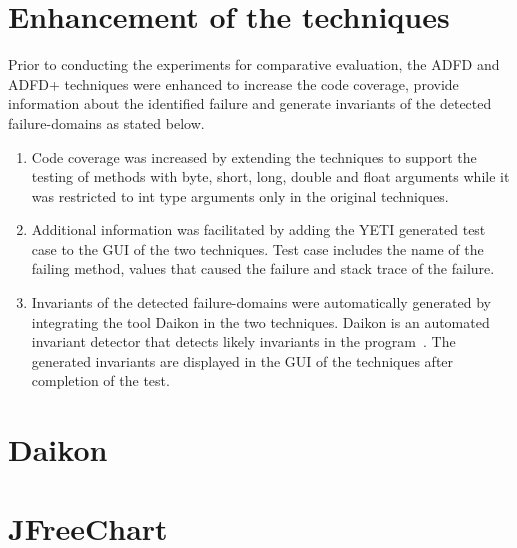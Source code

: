 \section{Enhancement of the techniques}
Prior to conducting the experiments for comparative evaluation, the ADFD and ADFD+ techniques were enhanced to increase the code coverage, provide information about the identified failure and generate invariants of the detected failure-domains as stated below.
\begin{enumerate}

\item Code coverage was increased by extending the techniques to support the testing of methods with byte, short, long, double and float arguments while it was restricted to int type arguments only in the original techniques.

\item Additional information was facilitated by adding the YETI generated test case to the GUI of the two techniques. Test case includes the name of the failing method, values that caused the failure and stack trace of the failure.

\item Invariants of the detected failure-domains were automatically generated by integrating the tool Daikon in the two techniques. Daikon is an automated invariant detector that detects likely invariants in the program~\cite{ernst2007daikon}. The generated invariants are displayed in the GUI of the techniques after completion of the test. 

\end{enumerate}


\section{Daikon}


\section{JFreeChart}







